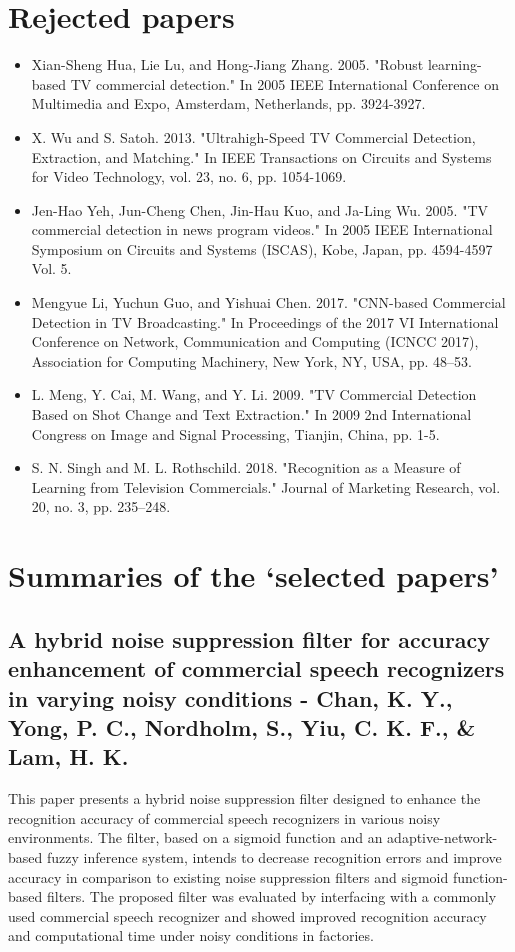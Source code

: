 \documentclass[12pt, twoside]{article}
\begin{document}
\section{Rejected papers}
\begin{itemize}
\item Xian-Sheng Hua, Lie Lu, and Hong-Jiang Zhang. 2005. "Robust learning-based TV commercial detection." In 2005 IEEE International Conference on Multimedia and Expo, Amsterdam, Netherlands, pp. 3924-3927.
\item X. Wu and S. Satoh. 2013. "Ultrahigh-Speed TV Commercial Detection, Extraction, and Matching." In IEEE Transactions on Circuits and Systems for Video Technology, vol. 23, no. 6, pp. 1054-1069.
\item Jen-Hao Yeh, Jun-Cheng Chen, Jin-Hau Kuo, and Ja-Ling Wu. 2005. "TV commercial detection in news program videos." In 2005 IEEE International Symposium on Circuits and Systems (ISCAS), Kobe, Japan, pp. 4594-4597 Vol. 5.
\item Mengyue Li, Yuchun Guo, and Yishuai Chen. 2017. "CNN-based Commercial Detection in TV Broadcasting." In Proceedings of the 2017 VI International Conference on Network, Communication and Computing (ICNCC 2017), Association for Computing Machinery, New York, NY, USA, pp. 48–53.
\item L. Meng, Y. Cai, M. Wang, and Y. Li. 2009. "TV Commercial Detection Based on Shot Change and Text Extraction." In 2009 2nd International Congress on Image and Signal Processing, Tianjin, China, pp. 1-5.
\item S. N. Singh and M. L. Rothschild. 2018. "Recognition as a Measure of Learning from Television Commercials." Journal of Marketing Research, vol. 20, no. 3, pp. 235–248.

\end{itemize}

\section{Summaries of the ‘selected papers’}
\subsection{A hybrid noise suppression filter for accuracy enhancement of commercial speech recognizers in varying noisy conditions - Chan, K. Y., Yong, P. C., Nordholm, S., Yiu, C. K. F., \& Lam, H. K.}
This paper presents a hybrid noise suppression filter designed to enhance the recognition accuracy of commercial speech recognizers in various noisy environments. The filter, based on a sigmoid function and an adaptive-network-based fuzzy inference system, intends to decrease recognition errors and improve accuracy in comparison to existing noise suppression filters and sigmoid function-based filters. The proposed filter was evaluated by interfacing with a commonly used commercial speech recognizer and showed improved recognition accuracy and computational time under noisy conditions in factories.
\end{document}
